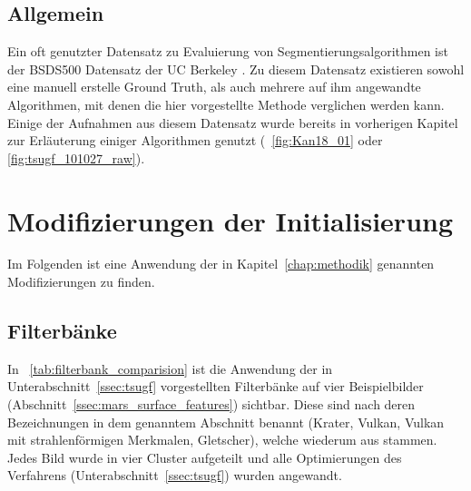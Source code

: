 \subsection{Allgemein}
\label{ssec:bsds500}
Ein oft genutzter Datensatz zu Evaluierung von Segmentierungsalgorithmen ist der BSDS500 Datensatz der UC Berkeley \cite{bsd500}. Zu diesem Datensatz existieren sowohl eine manuell erstelle Ground Truth, als auch mehrere auf ihm angewandte Algorithmen, mit denen die hier vorgestellte Methode verglichen werden kann.
Einige der Aufnahmen aus diesem Datensatz wurde bereits in vorherigen Kapitel zur Erläuterung einiger Algorithmen genutzt (\vgl \bspw \figurename~\ref{fig:Kan18_01} oder \ref{fig:tsugf_101027_raw}).

\section{Modifizierungen der Initialisierung}
\label{sec:modifications}

Im Folgenden ist eine Anwendung der in Kapitel~\ref{chap:methodik} genannten Modifizierungen zu finden.

\subsection{Filterbänke}
\label{ssec:exp_filterbanks}

In \tablename~\ref{tab:filterbank_comparision} ist die Anwendung der in Unterabschnitt~\ref{ssec:tsugf} vorgestellten Filterbänke auf vier Beispielbilder (\vgl Abschnitt~\ref{ssec:mars_surface_features}) sichtbar. Diese sind nach deren Bezeichnungen in dem genanntem Abschnitt benannt (Krater, Vulkan, Vulkan mit strahlenförmigen Merkmalen, Gletscher), welche wiederum aus \cite[Kap.~7]{greeley_13} stammen. Jedes Bild wurde in vier Cluster aufgeteilt und alle Optimierungen des Verfahrens (\vgl Unterabschnitt~\ref{ssec:tsugf}) wurden angewandt.

